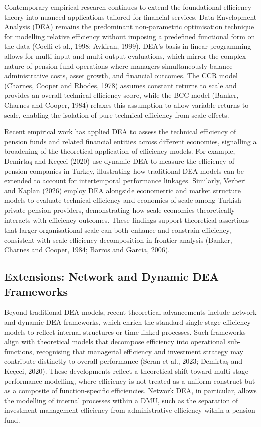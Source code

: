 \documentclass[12pt,a4paper]{article}
\begin{document}
Contemporary empirical research continues to extend the foundational efficiency theory into nuanced applications tailored for financial services. Data Envelopment Analysis (DEA) remains the predominant non-parametric optimisation technique for modelling relative efficiency without imposing a predefined functional form on the data (Coelli et al., 1998; Avkiran, 1999). DEA's basis in linear programming allows for multi-input and multi-output evaluations, which mirror the complex nature of pension fund operations where managers simultaneously balance administrative costs, asset growth, and financial outcomes. The CCR model (Charnes, Cooper and Rhodes, 1978) assumes constant returns to scale and provides an overall technical efficiency score, while the BCC model (Banker, Charnes and Cooper, 1984) relaxes this assumption to allow variable returns to scale, enabling the isolation of pure technical efficiency from scale effects.

Recent empirical work has applied DEA to assess the technical efficiency of pension funds and related financial entities across different economies, signalling a broadening of the theoretical application of efficiency models. For example, Demirta\c{s} and Ke\c{c}eci (2020) use dynamic DEA to measure the efficiency of pension companies in Turkey, illustrating how traditional DEA models can be extended to account for intertemporal performance linkages. Similarly, Verberi and Kaplan (2026) employ DEA alongside econometric and market structure models to evaluate technical efficiency and economies of scale among Turkish private pension providers, demonstrating how scale economics theoretically interacts with efficiency outcomes. These findings support theoretical assertions that larger organisational scale can both enhance and constrain efficiency, consistent with scale-efficiency decomposition in frontier analysis (Banker, Charnes and Cooper, 1984; Barros and Garcia, 2006).

\subsection{Extensions: Network and Dynamic DEA Frameworks}

Beyond traditional DEA models, recent theoretical advancements include network and dynamic DEA frameworks, which enrich the standard single-stage efficiency models to reflect internal structures or time-linked processes. Such frameworks align with theoretical models that decompose efficiency into operational sub-functions, recognising that managerial efficiency and investment strategy may contribute distinctly to overall performance (Seran et al., 2023; Demirta\c{s} and Ke\c{c}eci, 2020). These developments reflect a theoretical shift toward multi-stage performance modelling, where efficiency is not treated as a uniform construct but as a composite of function-specific efficiencies. Network DEA, in particular, allows the modelling of internal processes within a DMU, such as the separation of investment management efficiency from administrative efficiency within a pension fund.
\end{document}
